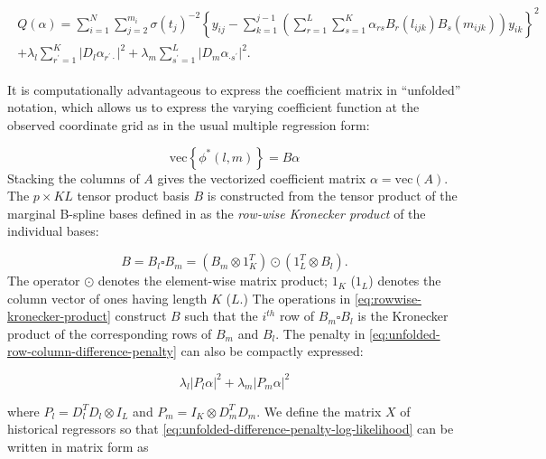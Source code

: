 \documentclass[12pt]{article}
\theoremstyle{definition}
\begin{document}
\begin{align} 
\begin{split}\label{eq:unfolded-difference-penalty-log-likelihood}
Q\left( \alpha \right) = \sum_{i=1}^N \sum_{j=2}^{m_i} \sigma\left({t_j}\right)^{-2} \left\{y_{ij} - \sum_{k=1}^{j-1} \left( \sum_{r=1}^L \sum_{s=1}^K \alpha_{rs} B_r\left(l_{ijk}\right)B_s\left(m_{ijk}\right)\right)y_{ik} \right\}^2 \\ 
+ \lambda_l \sum_{r^\prime=1}^K \vert D_l \alpha_{r^\prime \cdot} \vert^2 + \lambda_m \sum_{s^\prime=1}^L \vert D_m \alpha_{\cdot s^\prime} \vert^2.
\end{split}
\end{align}

It is computationally advantageous to express the coefficient matrix in ``unfolded'' notation, which allows us to express the varying coefficient function at the observed coordinate grid as in the usual multiple regression form:

\begin{equation*}
\mbox{vec}\left\{\phi^*\left(l,m\right)\right\} = B \alpha
\end{equation*}
\noindent
Stacking the columns of $A$ gives the vectorized coefficient matrix $\alpha = \mbox{vec}\left( A \right)$. The $p \times KL$ tensor product basis $B$ is constructed from the tensor product of the marginal B-spline bases defined in \citet{eilers2006fast} as the \textit{row-wise Kronecker product} of the individual bases:

\begin{equation} \label{eq:rowwise-kronecker-product}
B = B_l \square B_m = \left( B_m \otimes 1^T_{K} \right) \odot \left(1^T_{L} \otimes  B_l  \right).
\end{equation}
\noindent
The operator $\odot$ denotes the element-wise matrix product; $1_K$ ($1_L$) denotes the column vector of ones having length $K$ ($L$.) The operations in \ref{eq:rowwise-kronecker-product} construct $B$ such that the $i^{th}$ row of $B_m\square B_l$ is the Kronecker product of the corresponding rows of $B_m$ and $B_l$. The penalty in \ref{eq:unfolded-row-column-difference-penalty} can also be compactly expressed:

\[
\lambda_l \vert P_l \alpha \vert^2 + \lambda_m \vert P_m \alpha \vert^2
\]

where $P_l = D_l^T D_l \otimes I_ L$ and $P_m = I_K \otimes D_m^T D_m$. We define the matrix $X$ of historical regressors so that \ref{eq:unfolded-difference-penalty-log-likelihood} can be written in matrix form as
\end{document}
